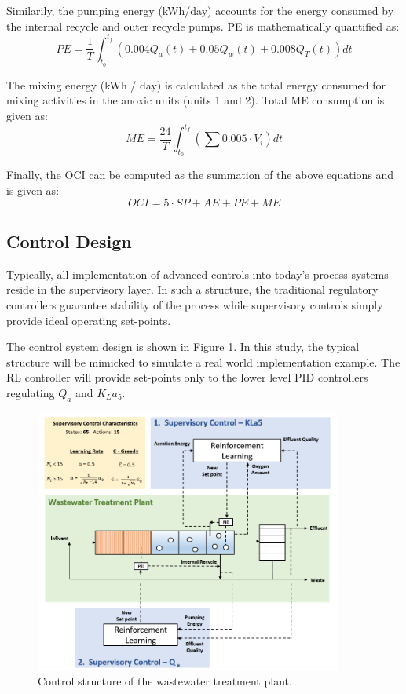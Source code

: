 Similarily, the pumping energy (kWh/day) accounts for the energy consumed by the internal recycle and outer recycle pumps.  PE is mathematically quantified as:
\begin{equation}
    PE = \frac{1}{T} \int_{t_0}^{t_f} (0.004 Q_a(t) + 0.05 Q_w(t) + 0.008 Q_T(t)) dt
\end{equation}

The mixing energy (kWh / day) is calculated as the total energy consumed for mixing activities in the anoxic units (units 1 and 2). Total ME consumption is given as:
\begin{equation}
    ME = \frac{24}{T} \int_{t_0}^{t_f} \left(\sum 0.005 \cdot V_i \right) dt
\end{equation}


Finally, the OCI can be computed as the summation of the above equations and is given as:
\begin{equation}
    OCI = 5 \cdot SP + AE + PE + ME
\end{equation}

\subsection{Control Design}
Typically, all implementation of advanced controls into today's process systems reside in the supervisory layer. In such a structure, the traditional regulatory controllers guarantee stability of the process while supervisory controls simply provide ideal operating set-points.

The control system design is shown in Figure \ref{fig:04wwtp_rl}. In this study, the typical structure will be mimicked to simulate a real world implementation example. The RL controller will provide set-points only to the lower level PID controllers regulating $Q_a$ and $K_La_5$.

\begin{figure}
    \centering
    \includegraphics[width=0.9\textwidth]{images/ch4/supervisory_control.png}
    \caption{Control structure of the wastewater treatment plant.}
    \label{fig:04wwtp_rl}
\end{figure}

